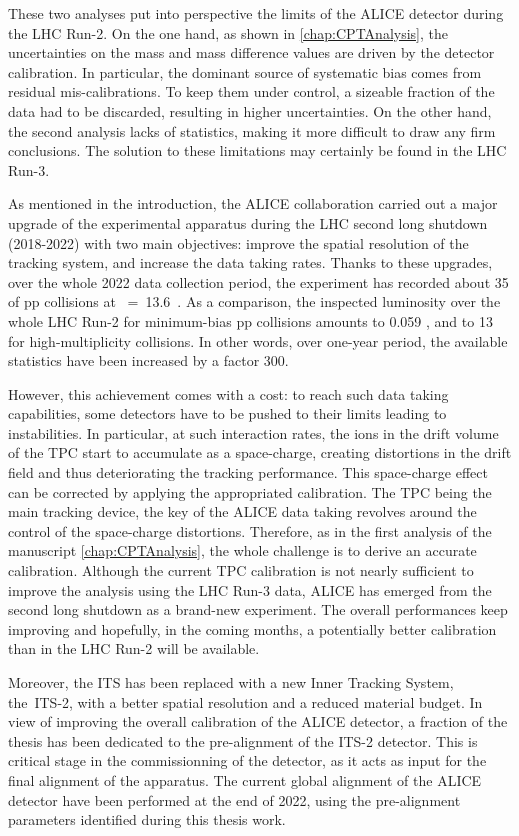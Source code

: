 These two analyses put into perspective the limits of the ALICE detector during the LHC Run-2. On the one hand, as shown in \chap\ref{chap:CPTAnalysis}, the uncertainties on the mass and mass difference values are driven by the detector calibration. In particular, the dominant source of systematic bias comes from residual mis-calibrations. To keep them under control, a sizeable fraction of the data had to be discarded, resulting in higher uncertainties. On the other hand, the second analysis lacks of statistics, making it more difficult to draw any firm conclusions. The solution to these limitations may certainly be found in the LHC Run-3.


As mentioned in the introduction, the ALICE collaboration carried out a major upgrade of the experimental apparatus during the LHC second long shutdown (2018-2022) with two main objectives: improve the spatial resolution of the tracking system, and increase the data taking rates. Thanks to these upgrades, over the whole 2022 data collection period, the experiment has recorded about 35 \invpb of pp collisions at \sqrtS~=~13.6~\tev \cite{cern152ndLHCCMeeting2022}. As a comparison, the inspected luminosity over the whole LHC Run-2 for minimum-bias pp collisions amounts to 0.059 \invpb, and to 13 \invpb for high-multiplicity collisions. In other words, over one-year period, the available statistics have been increased by a factor 300.

However, this achievement comes with a cost: to reach such data taking capabilities, some detectors have to be pushed to their limits leading to instabilities. In particular, at such interaction rates, the ions in the drift volume of the TPC start to accumulate as a space-charge, creating distortions in the drift field and thus deteriorating the tracking performance. This space-charge effect can be corrected by applying the appropriated calibration. The TPC being the main tracking device, the key of the ALICE data taking revolves around the control of the space-charge distortions. Therefore, as in the first analysis of the manuscript \chap\ref{chap:CPTAnalysis}, the whole challenge is to derive an accurate calibration. Although the current TPC calibration is not nearly sufficient to improve the analysis using the LHC Run-3 data, ALICE has emerged from the second long shutdown as a brand-new experiment. The overall performances keep improving and hopefully, in the coming months, a potentially better calibration than in the LHC Run-2 will be available.

Moreover, the ITS has been replaced with a new Inner Tracking System, the~ITS-2, with a better spatial resolution and a reduced material budget. In view of improving the overall calibration of the ALICE detector, a fraction of the thesis has been dedicated to the pre-alignment of the ITS-2 detector. This is critical stage in the commissionning of the detector, as it acts as input for the final alignment of the apparatus. The current global alignment of the ALICE detector have been performed at the end of 2022, using the pre-alignment parameters identified during this thesis work.

